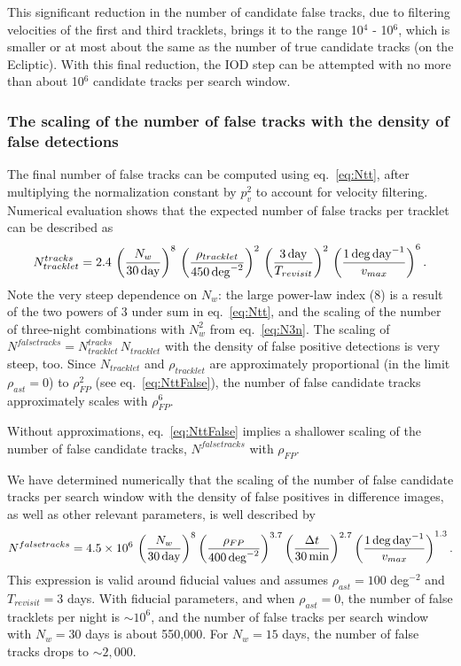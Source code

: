 This significant reduction in the number of candidate false tracks, due to filtering velocities
of the first and third tracklets, brings it to the range 10$^{4}$ - 10$^{6}$, which is smaller or at
most about the same as the number of true candidate tracks (on the Ecliptic). With this final
reduction, the IOD step can be attempted with no more than about 10$^6$ candidate tracks per
search window.



\subsubsection{The scaling of the number of false tracks with the density of false detections}

The final number of false tracks can be computed using eq.~\ref{eq:Ntt}, after multiplying
the normalization constant by $p_v^2$ to account for velocity filtering. Numerical evaluation
shows that the expected number of false tracks per tracklet can be described as
\begin{equation}
\label{eq:NttFinalFit}
   N_{tracklet}^{tracks} = 2.4 \, \left({N_w\over 30\, {\rm day}}\right)^8 \, \left( \rho_{tracklet}  \over 450
        \, {\rm deg}^{-2} \right)^2 \, \left( {3\,{\rm day} \over T_{revisit}} \right)^2 \,
         \left( {1 \, {\rm deg} \, {\rm day}^{-1}  \over  v_{max} }\right)^6.
\end{equation}
Note the very steep dependence on $N_w$: the large power-law index (8) is a result of the two
powers of 3 under sum in eq.~\ref{eq:Ntt}, and the scaling of the number of three-night
combinations with $N_w^2$ from eq.~\ref{eq:N3n}. The scaling of $N^{falsetracks} = N_{tracklet}^{tracks} \, N_{tracklet}$
with the density of false positive detections is very steep, too. Since $N_{tracklet}$ and $\rho_{tracklet}$
are approximately proportional (in the limit $\rho_{ast}=0$) to $\rho_{FP}^2$ (see eq.~\ref{eq:NttFalse}),
the number of false candidate tracks approximately scales with $\rho_{FP}^6$.

Without approximations, eq.~\ref{eq:NttFalse} implies a shallower scaling of the number
of false candidate tracks, $N^{falsetracks}$ with $\rho_{FP}$.

We have determined numerically that the scaling of the number
of false candidate tracks per search window with the density of false positives in difference
images, as well as other relevant parameters, is well described by
\begin{equation}
\label{eq:falsetracks}
   N^{falsetracks} = 4.5 \times 10^6 \, \left( {N_w \over 30 \, {\rm day} } \right)^{8} \left( {\rho_{FP} \over 400 \, {\rm deg}^{-2} }\right)^{3.7}
    \left( {\Delta t  \over 30 \, {\rm min}} \right)^{2.7}
     \left( { 1 \, {\rm deg} \, {\rm day}^{-1} \over v_{max} }  \right)^{1.3}.
\end{equation}
This expression is valid around fiducial values and assumes $\rho_{ast}=100$ deg$^{-2}$
and $T_{revisit}=3$ days. With fiducial parameters, and when $\rho_{ast}=0$, the number of
false tracklets per night is $\sim10^6$, and the number of false tracks per search window
with $N_w=30$ days is about 550,000. For $N_w=15$ days,  the number of false tracks
drops to $\sim2,000$.

